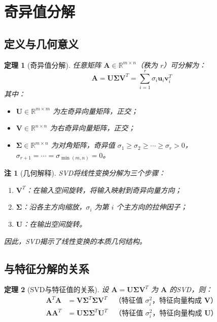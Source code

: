 \documentclass[UTF8, 10pt]{ctexart}
\newtheorem{theorem}{定理}[section]
\newtheorem{remark}{注}[section]
\newcommand{\R}{\mathbb{R}}
\begin{document}
\section{奇异值分解}
\subsection{定义与几何意义}
\begin{theorem}[奇异值分解]
任意矩阵 $\bm{A} \in \R^{m \times n}$（秩为 $r$）可分解为：
\[
\bm{A} = \bm{U} \bm{\Sigma} \bm{V}^T = \sum_{i=1}^{r} \sigma_i \bm{u}_i \bm{v}_i^T
\]
其中：
\begin{itemize}
    \item $\bm{U} \in \R^{m \times m}$ 为左奇异向量矩阵，正交；
    \item $\bm{V} \in \R^{n \times n}$ 为右奇异向量矩阵，正交；
    \item $\bm{\Sigma} \in \R^{m \times n}$ 为对角矩阵，奇异值 $\sigma_1 \ge \sigma_2 \ge \cdots \ge \sigma_r > 0$，$\sigma_{r+1} = \cdots = \sigma_{\min(m,n)} = 0$。
\end{itemize}
\end{theorem}

\begin{remark}[几何解释]
SVD将线性变换分解为三个步骤：
\begin{enumerate}
    \item $\bm{V}^T$：在输入空间旋转，将输入映射到奇异向量方向；
    \item $\bm{\Sigma}$：沿各主方向缩放，$\sigma_i$ 为第 $i$ 个主方向的拉伸因子；
    \item $\bm{U}$：在输出空间旋转。
\end{enumerate}
因此，SVD揭示了线性变换的本质几何结构。
\end{remark}

\subsection{与特征分解的关系}
\begin{theorem}[SVD与特征值的关系]
设 $\bm{A} = \bm{U} \bm{\Sigma} \bm{V}^T$ 为 $\bm{A}$ 的SVD，则：
\begin{align*}
    \bm{A}^T\bm{A} &= \bm{V} \bm{\Sigma}^T \bm{\Sigma} \bm{V}^T \quad \text{（特征值 } \sigma_i^2\text{，特征向量构成 }\bm{V}\text{）}\\
    \bm{A}\bm{A}^T &= \bm{U} \bm{\Sigma} \bm{\Sigma}^T \bm{U}^T \quad \text{（特征值 } \sigma_i^2\text{，特征向量构成 }\bm{U}\text{）}
\end{align*}
\end{theorem}
\end{document}
